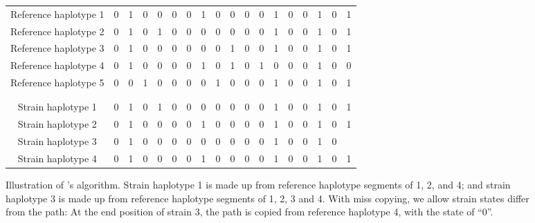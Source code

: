 \documentclass{bioinfo}
\begin{document}
\begin{methods}
\begin{figure}[ht]
\centering
\begin{tabular}{c||ccccccccccccccccc}
\rowcolor{yellow!50}\cellcolor{white}Reference haplotype  1 & 0&1&0&0&0&0&1&0&0&0&0&1&0&0&1&0&1\\
\rowcolor{blue!50}\cellcolor{white}Reference haplotype  2 & 0&1&0&1&0&0&0&0&0&0&0&1&0&0&1&0&1\\
\rowcolor{red!50}\cellcolor{white}Reference haplotype  3 & 0&1&0&0&0&0&0&0&1&0&0&1&0&0&1&0&1\\
\rowcolor{green!50}\cellcolor{white}Reference haplotype  4 & 0&1&0&0&0&0&1&0&1&0&1&0&0&0&1&0&0\\
\rowcolor{RubineRed!90}\cellcolor{white}Reference haplotype  5 & 0&0&1&0&0&0&0&1&0&0&0&1&0&0&1&0&1\\
\multicolumn{3}{c}{ }\\
\multicolumn{3}{c}{ }\\
Strain haplotype 1 & \cellcolor{blue!50}0&\cellcolor{blue!50}1&\cellcolor{blue!50}0&\cellcolor{blue!50}1&\cellcolor{green!50}0&\cellcolor{green!50}0&\cellcolor{blue!50}0&\cellcolor{blue!50}0&\cellcolor{blue!50}0&\cellcolor{yellow!50}0&\cellcolor{yellow!50}0&\cellcolor{yellow!50}1&\cellcolor{yellow!50}0&\cellcolor{yellow!50}0&\cellcolor{yellow!50}1&\cellcolor{yellow!50}0&\cellcolor{yellow!50}1\\
Strain haplotype 2 & 0&1&0&0&0&0&1&0&0&0&0&1&0&0&1&0&1\\
Strain haplotype 3 & \cellcolor{red!50}0&\cellcolor{red!50}1&\cellcolor{red!50}0&\cellcolor{red!50}0&\cellcolor{red!50}0&\cellcolor{red!50}0&\cellcolor{red!50}0&\cellcolor{red!50}0&\cellcolor{blue!50}0&\cellcolor{blue!50}0&\cellcolor{blue!50}0&\cellcolor{yellow!50}1&\cellcolor{yellow!50}0&\cellcolor{yellow!50}0&\cellcolor{green!50}1&\cellcolor{green!50}0&\cellcolor{green!50}{\color{red}1}\\
Strain haplotype 4 & 0&1&0&0&0&0&1&0&0&0&0&1&0&0&1&0&1\\
\end{tabular}
\caption{Illustration of \citet{Li2003}'s algorithm. Strain haplotype 1 is made up from reference haplotype segments of 1, 2, and 4; and strain haplotype 3 is made up from reference haplotype segments of 1, 2, 3 and 4. With miss copying, we allow strain states differ from the path: At the end position of strain 3, the path is copied from reference haplotype 4, with the state of ``0''.
}\label{fig:ls}
\end{figure}


\end{methods}
\end{document}
